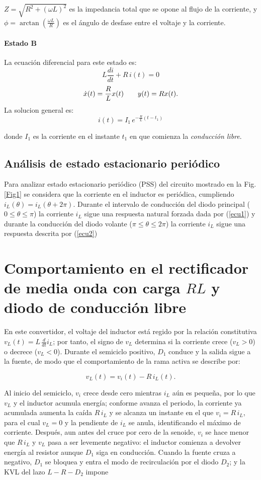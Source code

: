 \documentclass[conference]{IEEEtran}
\begin{document}
$Z = \sqrt{R^2 + (\omega L)^2}$ es la impedancia total que se opone al flujo de la corriente, y $\phi = \arctan\left(\frac{\omega L}{R}\right)$ es el ángulo de desfase entre el voltaje y la corriente. 

\paragraph{Estado B}
La ecuación diferencial para este estado es:
\[
L\frac{di}{dt} + R\,i(t) = 0
\]
\[
\dot{x}(t)
=
\-\dfrac{R}{L}
x(t)
\qquad
y(t)=Rx(t).
\]
La solucion general es:
\begin{equation}
i(t)=I_1\,e^{-\frac{R}{L}(t-t_1)}
\label{ecu2}
\end{equation}

donde \(I_1\) es la corriente en el instante \(t_1\) en que comienza la \emph{conducción libre}.
\subsection{Análisis de estado estacionario periódico}
Para analizar estado estacionario periódico (PSS) del circuito mostrado en la Fig. \ref{Fig1} se considera que la corriente en el inductor
es periódica, cumpliendo $i_L(\theta)=i_L(\theta+2\pi)$. Durante el intervalo de conducción del diodo principal ($0 \leq \theta \leq \pi$) la corriente $i_L$ sigue una respuesta natural forzada
dada por (\ref{ecu1}) y durante la conducción del diodo volante ($\pi \leq \theta \leq 2\pi$) la corriente $i_L$ sigue una respuesta descrita por (\ref{ecu2})

\section{Comportamiento en el rectificador de media onda con carga $RL$ y diodo de conducción libre}
En este convertidor, el voltaje del inductor está regido por la relación constitutiva $v_L(t)=L\,\tfrac{d}{dt}i_L$; por tanto, el signo de $v_L$ determina si la corriente crece ($v_L>0$) o decrece ($v_L<0$). Durante el semiciclo positivo, $D_1$ conduce y la salida sigue a la fuente, de modo que el comportamiento de la rama activa se describe por:

\begin{equation*}
	v_L(t)=v_i(t)-R\,i_L(t).
\end{equation*}

Al inicio del semiciclo, $v_i$ crece desde cero mientras $i_L$ aún es pequeña, por lo que $v_L$ y el inductor acumula energía; conforme avanza el periodo, la corriente ya acumulada aumenta la caída $R\,i_L$ y se alcanza un instante en el que $v_i=R\,i_L$, para el cual $v_L=0$ y la pendiente de $i_L$ se anula, identificando el máximo de corriente. Después, aun antes del cruce por cero de la senoide, $v_i$ se hace menor que $R\,i_L$ y $v_L$ pasa a ser levemente negativo: el inductor comienza a devolver energía al resistor aunque $D_1$ siga en conducción. Cuando la fuente cruza a negativo, $D_1$ se bloquea y entra el modo de recirculación por el diodo $D_2$; y la KVL del lazo $L\!-\!R\!-\!D_2$ impone
\end{document}
